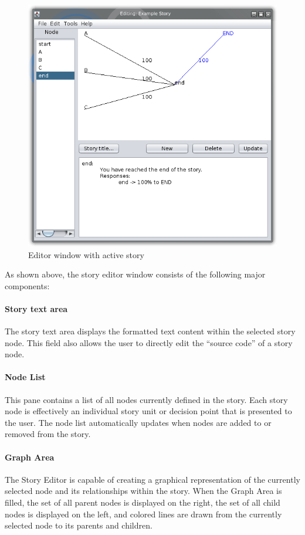 \documentclass[12pt,letterpaper]{article}
\begin{document}
\begin{figure}
    \begin{center}
        \includegraphics[scale=1]{examplewindow.png}
    \end{center}
    \caption{Editor window with active story}
\end{figure}

As shown above, the story editor window consists of the following major components:

\paragraph{Story text area}
The story text area displays the formatted text content within the selected story node. This field also allows the user to directly edit the ``source code'' of a story node.

\paragraph{Node List}
This pane contains a list of all nodes currently defined in the story. Each story node is effectively an individual story unit or decision point that is presented to the user.
The node list automatically updates when nodes are added to or removed from the story. 

\paragraph{Graph Area}
The Story Editor is capable of creating a graphical representation of the currently selected node and its relationships within the story.
When the Graph Area is filled, the set of all parent nodes is displayed on the right, the set of all child nodes is displayed on the left, and colored lines are drawn from the currently selected node to its parents and children.
\end{document}

